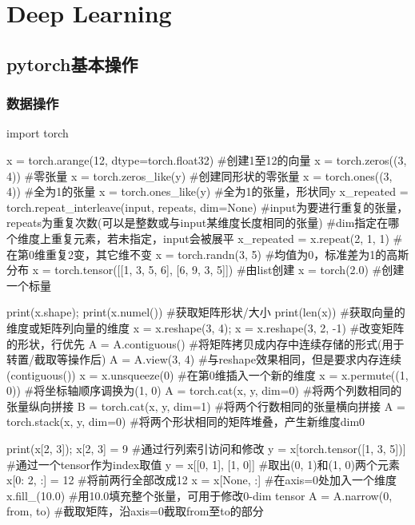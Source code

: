 \section{Deep Learning}

  \subsection{pytorch基本操作}
    \subsubsection{数据操作}
      \begin{codeblock}[language=python, caption={basic manipulation}]
        import torch

        x = torch.arange(12, dtype=torch.float32) #创建1至12的向量
        x = torch.zeros((3, 4)) #零张量
        x = torch.zeros_like(y) #创建同形状的零张量
        x = torch.ones((3, 4)) #全为1的张量
        x = torch.ones_like(y) #全为1的张量，形状同y
        x_repeated = torch.repeat_interleave(input, repeats, dim=None)
            #input为要进行重复的张量，repeats为重复次数(可以是整数或与input某维度长度相同的张量)
            #dim指定在哪个维度上重复元素，若未指定，input会被展平
        x_repeated = x.repeat(2, 1, 1) #在第0维重复2变，其它维不变
        x = torch.randn(3, 5) #均值为0，标准差为1的高斯分布 
        x = torch.tensor([[1, 3, 5, 6], [6, 9, 3, 5]]) #由list创建
        x = torch(2.0) #创建一个标量

        print(x.shape); print(x.numel()) #获取矩阵形状/大小
        print(len(x)) #获取向量的维度或矩阵列向量的维度
        x = x.reshape(3, 4); x = x.reshape(3, 2, -1) #改变矩阵的形状，行优先
        A = A.contiguous() #将矩阵拷贝成内存中连续存储的形式(用于转置/截取等操作后)
        A = A.view(3, 4) #与reshape效果相同，但是要求内存连续(contiguous())
        x = x.unsqueeze(0) #在第0维插入一个新的维度
        x = x.permute((1, 0)) #将坐标轴顺序调换为(1, 0)
        A = torch.cat(x, y, dim=0) #将两个列数相同的张量纵向拼接
        B = torch.cat(x, y, dim=1) #将两个行数相同的张量横向拼接
        A = torch.stack(x, y, dim=0) #将两个形状相同的矩阵堆叠，产生新维度dim0

        print(x[2, 3]); x[2, 3] = 9 #通过行列索引访问和修改
        y = x[torch.tensor([1, 3, 5])] #通过一个tensor作为index取值
        y = x[[0, 1], [1, 0]] #取出(0, 1)和(1, 0)两个元素
        x[0: 2, :] = 12 #将前两行全部改成12
        x = x[None, :] #在axis=0处加入一个维度
        x.fill_(10.0) #用10.0填充整个张量，可用于修改0-dim tensor
        A = A.narrow(0, from, to) #截取矩阵，沿axis=0截取from至to的部分


\end{codeblock}
